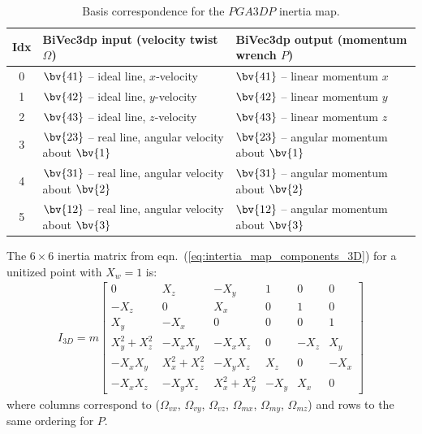 \begin{table}[h!]
\centering\small
\begin{tabular}{c|p{5.7cm}|p{5.7cm}}
\hline
Idx & BiVec3dp input (velocity twist $\Omega$) & BiVec3dp output (momentum wrench $P$) \\
\hline
0 & $\bv{41}$ -- ideal line, $x$-velocity &
$\bv{41}$ -- linear momentum $x$
\\
1 & $\bv{42}$ -- ideal line, $y$-velocity &
$\bv{42}$ -- linear momentum $y$
\\
2 & $\bv{43}$ -- ideal line, $z$-velocity &
$\bv{43}$ -- linear momentum $z$
\\
3 & $\bv{23}$ -- real line, angular velocity about $\bv{1}$ &
$\bv{23}$ -- angular momentum about $\bv{1}$
\\
4 & $\bv{31}$ -- real line, angular velocity about $\bv{2}$ &
$\bv{31}$ -- angular momentum about $\bv{2}$
\\
5 & $\bv{12}$ -- real line, angular velocity about $\bv{3}$ &
$\bv{12}$ -- angular momentum about $\bv{3}$
\\
\hline
\end{tabular}
\caption{Basis correspondence for the $PGA3DP$ inertia map.}
\label{tab:basis_pga3dp}
\end{table}

The $6\times6$ inertia matrix from eqn.~(\ref{eq:intertia_map_components_3D}) for a
unitized point with $X_w = 1$ is:
\begin{align}
    I_{3D} = m
    \begin{bmatrix}
      0              &  X_z           & -X_y           & 1    &  0   &  0   \\
      -X_z           &  0             &  X_x           & 0    &  1   &  0   \\
       X_y           & -X_x           &  0             & 0    &  0   &  1   \\
       X_y^2 + X_z^2 & -X_x X_y       & -X_x X_z       & 0    & -X_z &  X_y \\
      -X_x X_y       &  X_x^2 + X_z^2 & -X_y X_z       & X_z  &  0   & -X_x \\
      -X_x X_z       & -X_y X_z       &  X_x^2 + X_y^2 & -X_y &  X_x &  0
    \end{bmatrix}
    \label{eq:inertia_3D_unitized}
\end{align}
where columns correspond to ($\Omega_{vx}$, $\Omega_{vy}$, $\Omega_{vz}$, $\Omega_{mx}$,
$\Omega_{my}$, $\Omega_{mz}$) and rows to the same ordering for $P$. \\

